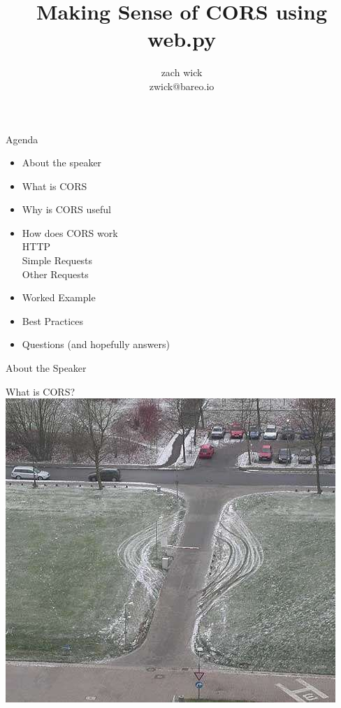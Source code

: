 \documentclass[11pt]{beamer}
\author{zach wick \\ zwick@bareo.io}
\title{Making Sense of CORS using web.py}
\begin{document}

\begin{frame}
  \titlepage
\end{frame}

\begin{frame}{Agenda}
  \begin{itemize}
  \item About the speaker\\
  \item What is CORS\\
  \item Why is CORS useful\\
  \item How does CORS work\\
    \subitem HTTP\\
    \subitem Simple Requests\\
    \subitem Other Requests\\
  \item Worked Example\\
  \item Best Practices\\
  \item Questions (and hopefully answers)
  \end{itemize}
\end{frame}

\begin{frame}{About the Speaker}

\end{frame}
\begin{frame}{What is CORS?}
  \includegraphics[keepaspectratio=true,width=\framewidth]{circumvent.jpeg}
\end{frame}
\end{document}
